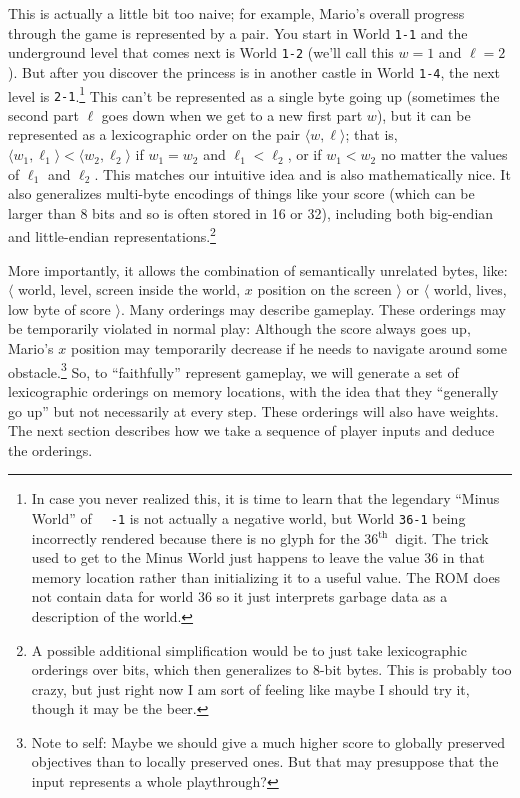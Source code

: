 \documentclass[twocolumn]{article}
\renewcommand\th{$^{\mathrm{th}}$}
\begin{document}
This is actually a little bit too naive; for example, Mario's overall
progress through the game is represented by a pair. You start in World
{\tt 1-1} and the underground level that comes next is World {\tt 1-2}
(we'll call this $w=1$ and $\ell=2$). But after you discover the
princess is in another castle in World {\tt 1-4}, the next level is
{\tt 2-1}.\footnote{In case you never realized this, it is time to learn
  that the legendary ``Minus World'' of {\tt\, -1} is not actually a
  negative world, but World {\tt 36-1} being incorrectly rendered because
  there is no glyph for the 36\th\ digit. The trick used to get to the
  Minus World just happens to leave the value 36 in that memory
  location rather than initializing it to a useful value. The ROM does
  not contain data for world 36 so it just interprets garbage data as
  a description of the world.} This can't be represented as a single
byte going up (sometimes the second part $\ell$ goes down when we get
to a new first part $w$), but it can be represented as a lexicographic
order on the pair $\langle w, \ell \rangle$; that is, $\langle w_1,
\ell_1 \rangle < \langle w_2, \ell_2 \rangle$ if $w_1 = w_2$ and $\ell_1 <
\ell_2$, or if $w_1 < w_2$ no matter the values of $\ell_1$ and
$\ell_2$. This matches our intuitive idea and is also mathematically
nice. It also generalizes multi-byte encodings of things like your
score (which can be larger than 8 bits and so is often stored in 16 or
32), including both big-endian and little-endian
representations.\footnote{A possible additional simplification would
  be to just take lexicographic orderings over bits, which then
  generalizes to 8-bit bytes. This is probably too crazy, but just
  right now I am sort of feeling like maybe I should try it, though it
  may be the beer.}

More importantly, it allows the combination of semantically unrelated
bytes, like: $\langle$\!\!\!\! world, level, screen inside the world,
$x$ position on the screen \!\!$\rangle$ or $\langle$\!\!\!\! world,
lives, low byte of score \!\!$\rangle$. Many orderings may describe
gameplay. These orderings may be temporarily violated in normal play:
Although the score always goes up, Mario's $x$ position may
temporarily decrease if he needs to navigate around some
obstacle.\footnote{Note to self: Maybe we should give a much higher
  score to globally preserved objectives than to locally preserved
  ones. But that may presuppose that the input represents a whole
  playthrough?} So, to ``faithfully'' represent gameplay, we will
generate a set of lexicographic orderings on memory locations, with
the idea that they ``generally go up'' but not necessarily at every
step. These orderings will also have weights. The next section
describes how we take a sequence of player inputs and deduce the
orderings.
\end{document}
